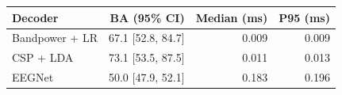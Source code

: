 \begin{tabular}{lrrr}
\toprule
Decoder & BA (95\% CI) & Median (ms) & P95 (ms) \\
\midrule
Bandpower + LR & 67.1 [52.8, 84.7] & 0.009 & 0.009 \\
CSP + LDA & 73.1 [53.5, 87.5] & 0.011 & 0.013 \\
EEGNet & 50.0 [47.9, 52.1] & 0.183 & 0.196 \\
\bottomrule
\end{tabular}
